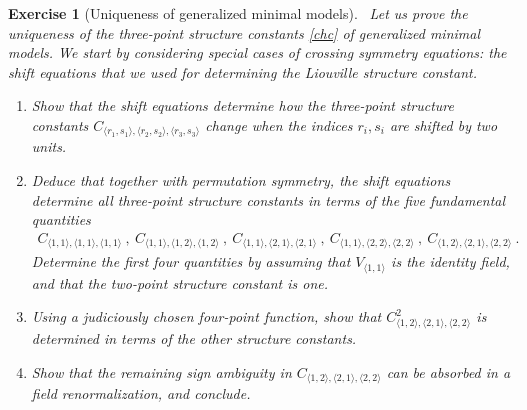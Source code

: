 \documentclass[12pt, a4paper, notitlepage, twoside]{report}
\numberwithin{equation}{section}
\theoremstyle{break}
\newtheorem{exo}{Exercise}[chapter]
\begin{document}
 \begin{exo}[Uniqueness of generalized minimal models]
 ~\label{exofix}
Let us prove the uniqueness of the three-point structure constants \eqref{chc} of generalized minimal models.
We start by considering special cases of crossing symmetry equations: the shift equations that we used for determining the Liouville structure constant.
 \begin{enumerate}
  \item Show that the shift equations determine how the three-point structure constants $C_{\langle r_1,s_1\rangle ,\langle r_2,s_2\rangle ,\langle r_3,s_3 \rangle}$ change when the indices $r_i,s_i$ are shifted by two units.
  \item Deduce that together with permutation symmetry, the shift equations determine all three-point structure constants in terms of the five fundamental quantities 
\begin{align}
 C_{\langle 1,1\rangle,\langle 1,1\rangle, \langle 1,1\rangle}
 \ , \ 
 C_{\langle 1,1\rangle,\langle 1,2\rangle, \langle 1,2\rangle}
 \ , \
 C_{\langle 1,1\rangle,\langle 2,1\rangle, \langle 2,1\rangle}
 \ , \
 C_{\langle 1,1\rangle,\langle 2,2\rangle, \langle 2,2\rangle}
 \ , \
 C_{\langle 1,2\rangle,\langle 2,1\rangle, \langle 2,2\rangle}\ .
\end{align}
Determine the first four quantities by assuming that $V_{\langle 1,1\rangle}$ is the identity field, and that the two-point structure constant is one.
\item Using a judiciously chosen four-point function, show that $C^2_{\langle 1,2\rangle,\langle 2,1\rangle, \langle 2,2\rangle}$ is determined in terms of the other structure constants. 
\item Show that the remaining sign ambiguity in $C_{\langle 1,2\rangle,\langle 2,1\rangle, \langle 2,2\rangle}$ can be absorbed in a field renormalization, and conclude. 
 \end{enumerate}
 \end{exo}
\end{document}
